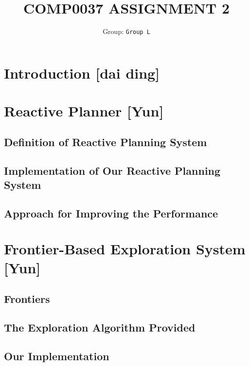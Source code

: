 \documentclass{article}
\title{COMP0037 ASSIGNMENT 2}
\author{
 Group: \texttt{Group L}\\
}
\date{}
\begin{document}
\maketitle



\section{Introduction [dai ding]} 

\section{Reactive Planner [Yun]}

\subsection {Definition of Reactive Planning System}

\subsection {Implementation of Our Reactive Planning System}

\subsection {Approach for Improving the Performance}

\section{Frontier-Based Exploration System [Yun]}

\subsection {Frontiers}

\subsection {The Exploration Algorithm Provided}

\subsection {Our Implementation}
\end{document}

